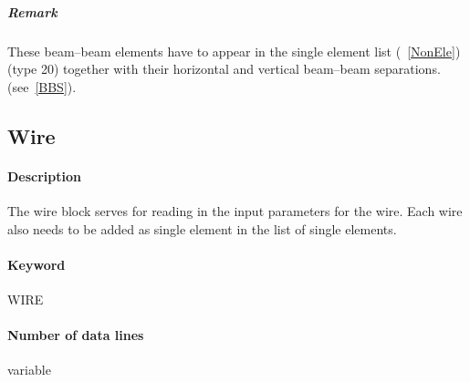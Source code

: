 \documentclass[a4paper,11pt]{report}
\begin{document}
\subparagraph{Remark} These beam--beam elements have to appear in the single element list (~\ref{NonEle}) (type 20) together
with their horizontal and vertical beam--beam separations.
(see~\ref{BBS}).

\subsection{Wire} \label{sec:WIRE}

\paragraph{Description} The wire block serves for reading in the input parameters for the wire. Each wire also needs to be added as single element in the list of single elements.

\paragraph{Keyword} WIRE

\paragraph{Number of data lines} variable
\end{document}
